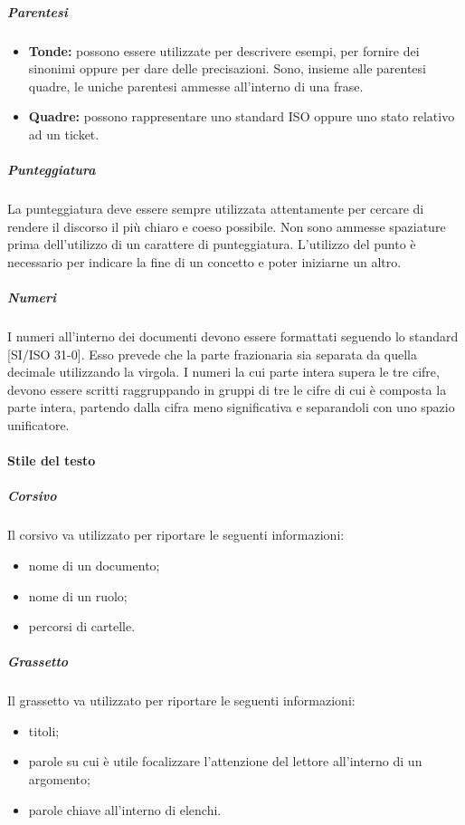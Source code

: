 \documentclass[../NormeProgetto.text]{subfiles}
\begin{document}
			\subparagraph{Parentesi}
				\begin{itemize}
					\item \textbf{Tonde:} possono essere utilizzate per descrivere esempi, per fornire dei sinonimi oppure per dare delle precisazioni. Sono, insieme alle parentesi quadre, le uniche parentesi ammesse all'interno di una frase.
					\item \textbf{Quadre:} possono rappresentare uno standard ISO oppure uno stato relativo ad un ticket\g. 
				\end{itemize}

			
			\subparagraph{Punteggiatura}
				La punteggiatura  deve essere sempre utilizzata attentamente per cercare di rendere il discorso il più chiaro e coeso possibile. Non sono ammesse spaziature prima dell'utilizzo di un carattere di punteggiatura. L'utilizzo del punto è necessario per indicare la fine di un concetto e poter iniziarne un altro.
			
			\subparagraph{Numeri}
				I numeri all'interno dei documenti devono essere formattati seguendo lo standard [SI/ISO 31-0]. Esso prevede che la parte frazionaria sia separata da quella decimale utilizzando la virgola. I numeri la cui parte intera supera le tre cifre, devono essere scritti raggruppando in gruppi di tre le cifre di cui è composta la parte intera, partendo dalla cifra meno significativa e separandoli con uno spazio unificatore.
			
		\paragraph{Stile del testo}

			\subparagraph{Corsivo}
				Il corsivo va utilizzato per riportare le seguenti informazioni:
				\begin{itemize}
					\item nome di un documento;
					\item nome di un ruolo;
					\item percorsi di cartelle.
				\end{itemize}						
			
			\subparagraph{Grassetto}
				Il grassetto va utilizzato per riportare le seguenti informazioni:
				\begin{itemize}
					\item titoli;
					\item parole su cui è utile focalizzare l'attenzione del lettore all'interno di un argomento;
					\item parole chiave all'interno di elenchi.
				\end{itemize}						
			
\end{document}
